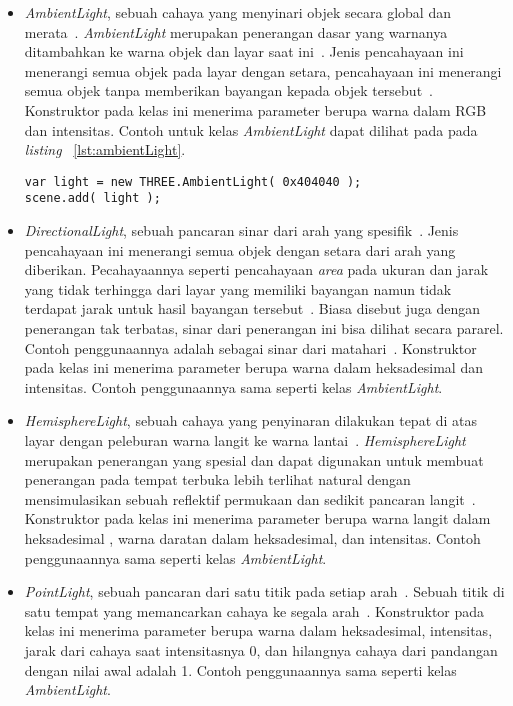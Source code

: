 \begin{itemize}
	\begin{itemize}
		\item {\it AmbientLight}, sebuah cahaya yang menyinari objek secara global dan merata~\cite{threejs}. {\it AmbientLight} merupakan penerangan dasar yang warnanya ditambahkan ke warna objek dan layar saat ini~\cite{learningThreejs}. Jenis pencahayaan ini menerangi semua objek pada layar dengan setara, pencahayaan ini menerangi semua objek tanpa memberikan bayangan kepada objek tersebut~\cite{conceptShading}. Konstruktor pada kelas ini menerima parameter berupa warna dalam RGB dan intensitas. Contoh untuk kelas {\it AmbientLight} dapat dilihat pada pada {\it listing} ~\ref{lst:ambientLight}.
\begin{lstlisting}[caption={Contoh penggunaan kelas {\it AmbientLight}.}, label={lst:ambientLight},captionpos=b]
var light = new THREE.AmbientLight( 0x404040 ); 
scene.add( light );
\end{lstlisting}
		\item {\it DirectionalLight}, sebuah pancaran sinar dari arah yang spesifik~\cite{threejs}. Jenis pencahayaan ini menerangi semua objek dengan setara dari arah yang diberikan. Pecahayaannya seperti pencahayaan {\it area} pada ukuran dan jarak yang tidak terhingga dari layar yang memiliki bayangan namun tidak terdapat jarak untuk hasil bayangan tersebut~\cite{conceptShading}. Biasa disebut juga dengan penerangan tak terbatas, sinar dari penerangan ini bisa dilihat secara pararel. Contoh penggunaannya adalah sebagai sinar dari matahari~\cite{learningThreejs}. Konstruktor pada kelas ini menerima parameter berupa warna dalam heksadesimal dan intensitas. Contoh penggunaannya sama seperti kelas {\it AmbientLight}.
		\item {\it HemisphereLight}, sebuah cahaya yang penyinaran dilakukan tepat di atas layar dengan peleburan warna langit ke warna lantai~\cite{threejs}. {\it HemisphereLight} merupakan penerangan yang spesial dan dapat digunakan untuk  membuat penerangan pada tempat terbuka lebih terlihat natural dengan mensimulasikan sebuah reflektif permukaan dan sedikit pancaran langit~\cite{learningThreejs}. Konstruktor pada kelas ini menerima parameter berupa warna langit dalam heksadesimal , warna daratan dalam heksadesimal, dan intensitas. Contoh penggunaannya sama seperti kelas {\it AmbientLight}.
		\item {\it PointLight}, sebuah pancaran dari satu titik pada setiap arah~\cite{threejs}. Sebuah titik di satu tempat yang memancarkan cahaya ke segala arah~\cite{learningThreejs}. Konstruktor pada kelas ini menerima parameter berupa warna dalam heksadesimal, intensitas, jarak dari cahaya saat intensitasnya 0, dan hilangnya cahaya dari pandangan dengan nilai awal adalah 1. Contoh penggunaannya sama seperti kelas {\it AmbientLight}.

\end{itemize}
\end{itemize}
